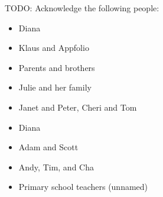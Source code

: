 \begin{acknowledgements}

TODO: Acknowledge the following people:

\begin{itemize}
\item Diana
\item Klaus and Appfolio
\item Parents and brothers
\item Julie and her family
\item Janet and Peter, Cheri and Tom
\item Diana
\item Adam and Scott
\item Andy, Tim, and Cha
\item Primary school teachers (unnamed)
\end{itemize}


\end{acknowledgements}
